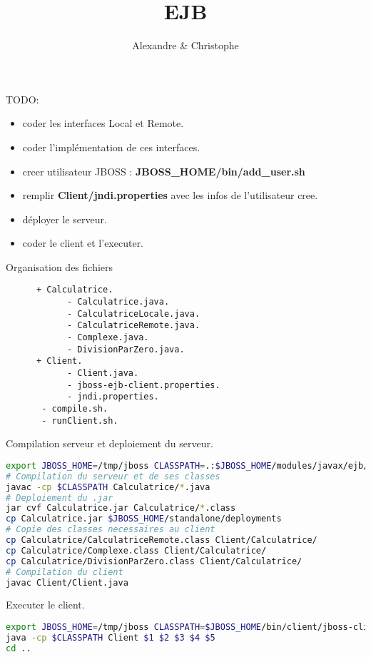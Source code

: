 \documentclass{article}
\title{\vspace{-5ex}EJB\vspace{-2ex}}
\author{Alexandre \bsc{Brehmer} \& Christophe \bsc{Cluizel}}
\begin{document}
\maketitle
\vspace{-6ex}

TODO:
\begin{itemize}
	\item coder les interfaces Local et Remote.
	\item coder l'implémentation de ces interfaces.
	\item creer utilisateur JBOSS : \textbf{JBOSS\_HOME/bin/add\_user.sh}
	\item remplir \textbf{Client/jndi.properties} avec les infos de l'utilisateur cree.
	\item déployer le serveur.
	\item coder le client et l'executer.
\end{itemize}

Organisation des fichiers
\begin{lstlisting}
      + Calculatrice.
            - Calculatrice.java.
            - CalculatriceLocale.java.
            - CalculatriceRemote.java.
            - Complexe.java.
            - DivisionParZero.java.
      + Client.
            - Client.java.
            - jboss-ejb-client.properties.
            - jndi.properties.
       - compile.sh.
       - runClient.sh.
\end{lstlisting}

Compilation serveur et deploiement du serveur.
\begin{lstlisting}[language=bash]
export JBOSS_HOME=/tmp/jboss CLASSPATH=.:$JBOSS_HOME/modules/javax/ejb/api/main/jboss-ejb-api_3.1_spec-1.0.1.Final.jar 
# Compilation du serveur et de ses classes
javac -cp $CLASSPATH Calculatrice/*.java
# Deploiement du .jar
jar cvf Calculatrice.jar Calculatrice/*.class
cp Calculatrice.jar $JBOSS_HOME/standalone/deployments
# Copie des classes necessaires au client
cp Calculatrice/CalculatriceRemote.class Client/Calculatrice/
cp Calculatrice/Complexe.class Client/Calculatrice/
cp Calculatrice/DivisionParZero.class Client/Calculatrice/
# Compilation du client
javac Client/Client.java
\end{lstlisting}

Executer le client.
\begin{lstlisting}[language=bash]
export JBOSS_HOME=/tmp/jboss CLASSPATH=$JBOSS_HOME/bin/client/jboss-client.jar:. cd Client
java -cp $CLASSPATH Client $1 $2 $3 $4 $5
cd ..
\end{lstlisting}
\end{document}
